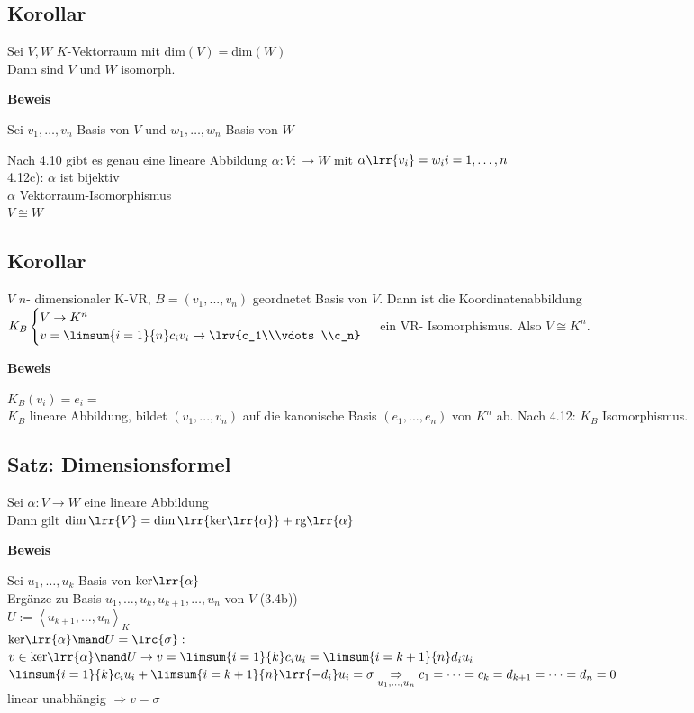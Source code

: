 \subsection{Korollar}
	Sei $V,W$ $K$-Vektorraum mit dim$(V)=$dim$(W)$\\
	Dann sind $V$ und $W$ isomorph.

	\textbf{Beweis}

	Sei $v_1,\dots,v_n$ Basis von $V$ und $w_1,\dots,w_n$ Basis von $W$

	Nach 4.10 gibt es genau eine lineare Abbildung $\alpha:V:\rightarrow W$ mit $\alpha\lrr{v_i}=w_i i=1,\dots,n$\\
	4.12c): $\alpha$ ist bijektiv\\
	$\alpha$ Vektorraum-Isomorphismus\\
	$V\cong W$

\subsection{Korollar}
  $V$ $n$- dimensionaler K-VR, $B=(v_1,...,v_n)$ geordnetet Basis von $V$. Dann
ist die Koordinatenabbildung $K_B\begin{cases}V\rightarrow
K^n\\v=\limsum{i=1}{n}c_iv_i\mapsto\lrv{c_1\\\vdots\\c_n}\end{cases}$ ein VR-
Isomorphismus. Also $V\cong K^n$.

  \textbf{Beweis}

  $K_B(v_i)=e_i=$\\
  $K_B$ lineare Abbildung, bildet $(v_1,...,v_n)$ auf die kanonische Basis
  $(e_1,...,e_n)$ von $K^n$ ab. Nach 4.12: $K_B$ Isomorphismus.

\subsection{Satz: Dimensionsformel}
	Sei $\alpha:V\rightarrow W$ eine lineare Abbildung\\
	Dann gilt $\dim\lrr{V}=\dim\lrr{\mbox{ker}\lrr{\alpha}}+\mbox{rg}\lrr{\alpha}$

	\textbf{Beweis}

	Sei $u_1,\dots,u_k$ Basis von $\mbox{ker}\lrr{\alpha}$\\
	Ergänze zu Basis $u_1,\dots,u_k,u_{k+1},\dots,u_n$ von $V$ (3.4b))\\
	$U:=\left\langle u_{k+1},\dots,u_n\right\rangle_K$\\
	$\mbox{ker}\lrr{\alpha}\mand U=\lrc{\sigma}:$\\
	$v\in\mbox{ker}\lrr{\alpha}\mand U\rightarrow v=\limsum{i=1}{k}c_iu_i=\limsum{i=k+1}{n}d_iu_i$\\
	$\limsum{i=1}{k}c_iu_i+\limsum{i=k+1}{n}\lrr{-d_i}u_i=\sigma\underset{\scriptstyle u_1,\dots,u_n}{\Rightarrow} c_1=\dots=c_k=d_{k+1}=\dots=d_n=0$\\
	linear unabhängig $\Rightarrow v=\sigma$


